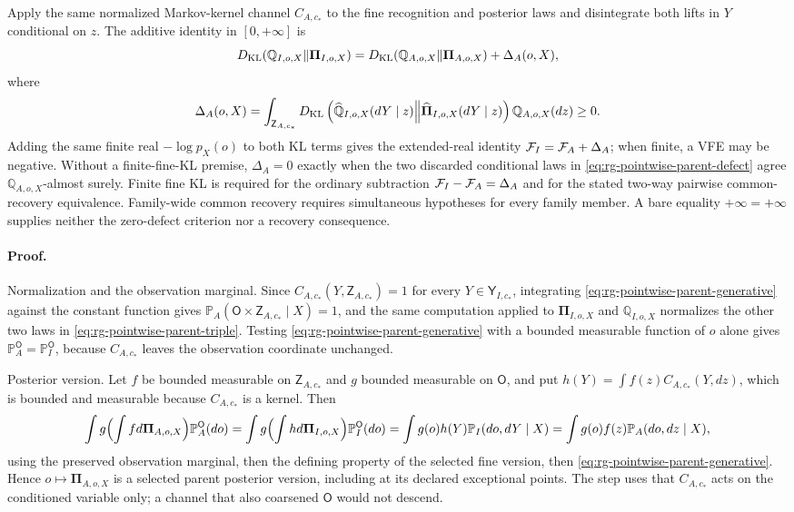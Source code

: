 Apply the same normalized Markov-kernel channel $C_{A,c_*}$ to the fine recognition and posterior laws and
disintegrate both lifts in
$Y$ conditional on $z$. The additive identity in $[0,+\infty]$ is
\begin{equation}
D_{\mathrm{KL}}(\mathbb Q_{I,o,X}\Vert\boldsymbol\Pi_{I,o,X})
=D_{\mathrm{KL}}(\mathbb Q_{A,o,X}\Vert\boldsymbol\Pi_{A,o,X})+\Delta_A(o,X),
\label{eq:rg-pointwise-parent-kl-chain}
\end{equation}
where
\begin{equation}
\Delta_A(o,X)=\int_{\mathsf Z_{A,c_*}}
D_{\mathrm{KL}}\left(
\widehat{\mathbb Q}_{I,o,X}(dY\mid z)
\middle\Vert
\widehat{\boldsymbol\Pi}_{I,o,X}(dY\mid z)
\right)\mathbb Q_{A,o,X}(dz)\geq0.
\label{eq:rg-pointwise-parent-defect}
\end{equation}
Adding the same finite real $-\log p_X(o)$ to both KL terms gives the extended-real identity
$\mathcal F_I=\mathcal F_A+\Delta_A$; when finite, a VFE may be negative. Without a finite-fine-KL
premise, $\Delta_A=0$ exactly when the two discarded conditional laws in
\eqref{eq:rg-pointwise-parent-defect} agree $\mathbb Q_{A,o,X}$-almost surely. Finite fine KL is
required for the ordinary subtraction $\mathcal F_I-\mathcal F_A=\Delta_A$ and for the stated two-way
pairwise common-recovery equivalence. Family-wide common recovery requires simultaneous hypotheses
for every family member. A bare equality $+\infty=+\infty$ supplies neither the zero-defect
criterion nor a recovery consequence. 

\paragraph{Proof.}
Normalization and the observation marginal.  Since
$C_{A,c_*}(Y,\mathsf Z_{A,c_*})=1$ for every
$Y\in\mathsf Y_{I,c_*}$, integrating \eqref{eq:rg-pointwise-parent-generative} against the constant
function gives $\mathbb P_A(\mathsf O\times\mathsf Z_{A,c_*}\mid X)=1$, and the same computation applied
to $\boldsymbol\Pi_{I,o,X}$ and $\mathbb Q_{I,o,X}$ normalizes the other two laws in
\eqref{eq:rg-pointwise-parent-triple}.  Testing
\eqref{eq:rg-pointwise-parent-generative} with a bounded measurable function of $o$ alone gives
$\mathbb P_A^{\mathsf O}=\mathbb P_I^{\mathsf O}$, because $C_{A,c_*}$ leaves the observation coordinate
unchanged.

Posterior version.  Let $f$ be bounded measurable on $\mathsf Z_{A,c_*}$ and $g$ bounded measurable on
$\mathsf O$, and put $h(Y)=\int f(z)C_{A,c_*}(Y,dz)$, which is bounded and measurable because
$C_{A,c_*}$ is a kernel.  Then
\[
\int g\Bigl(\int f d\boldsymbol\Pi_{A,o,X}\Bigr)\mathbb P_A^{\mathsf O}(do)
=\int g\Bigl(\int h d\boldsymbol\Pi_{I,o,X}\Bigr)\mathbb P_I^{\mathsf O}(do)
=\int g(o)h(Y) \mathbb P_I(do,dY\mid X)
=\int g(o)f(z) \mathbb P_A(do,dz\mid X),
\]
using the preserved observation marginal, then the defining property of the selected fine version,
then \eqref{eq:rg-pointwise-parent-generative}.  Hence $o\mapsto\boldsymbol\Pi_{A,o,X}$ is a selected
parent posterior version, including at its declared exceptional points.  The step uses that $C_{A,c_*}$
acts on the conditioned variable only; a channel that also coarsened $\mathsf O$ would not descend.

